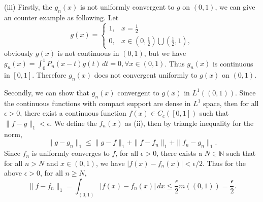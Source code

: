 \documentclass[12pt,a4paper]{ctexart}
\begin{document}
(iii) Firstly, the $g_{n}(x)$ is not uniformly convergent to $g$ on $(0, 1)$, we can give an counter example as following. Let
\begin{equation*}
g(x) =
\left\{
             \begin{array}{cl}
             1, & x = \frac{1}{2} \\
             0, & x \in (0, \frac{1}{2}) \bigcup (\frac{1}{2}, 1),
             \end{array}
\right.
\end{equation*}
obviously $g(x)$ is not continuous in $(0, 1)$, but we have $g_{n} (x) = \int_{0}^{1} P_{n}(x -t)g(t) \, d t = 0, \forall x \in (0, 1)$. Thus $g_{n} (x)$ is continuous in $[0, 1]$.  Therefore $g_{n}(x)$ does not convergent uniformly to $g(x)$ on $(0, 1)$.

Secondly, we can show that $g_{n}(x)$ convergent to $g(x)$ in $L^{1}((0, 1))$. Since the continuous functions with compact support are dense in $L^{1}$ space, then for all $\epsilon > 0$, there exist a continuous function $f(x) \in C_{c}([0, 1])$ such that $\|f- g \|_{1} < \epsilon$. We define the $f_{n}(x)$ as (ii), then by triangle inequality for the norm,
\begin{equation*}
\|g- g_{n} \|_{1} \leq  \|g- f \|_{1} + \|f- f_{n} \|_{1} + \|f_{n}- g_{n} \|_{1}.
\end{equation*}
Since $f_{n}$ is uniformly converges to $f$, for all $\epsilon > 0$, there exists a $N \in \mathbb{N}$ such that for all $n > N$ and $x \in (0,1)$, we have $|f(x)- f_{n}(x) | < \epsilon/2$. Thus for the above $\epsilon > 0$, for all $n \geq N$,
$$\|f - f_n\|_1 = \int_{(0,1)} |f(x) - f_n(x)| \, d x \leq \frac{\epsilon}{2} m((0,1)) = \frac{\epsilon}{2}.$$ 
\end{document}

